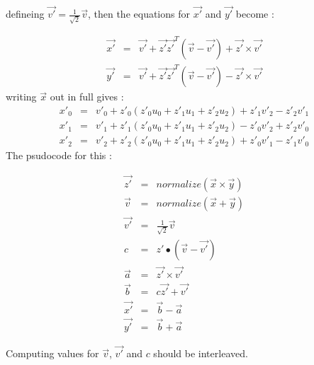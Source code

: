 \documentclass{article}
\begin{document}
defineing $\vec{v'} =  \frac{1}{\sqrt{2}} \vec{v} $, then the equations for $\vec{x'}$ and $\vec{y'}$ become :

\begin{eqnarray}
\vec{x'} &=& \vec{v'} + \vec{z'} \vec{z'}^T (\vec{v} - \vec{v'}) + \vec{z'}\times\vec{v'} \\
\vec{y'} &=& \vec{v'} + \vec{z'} \vec{z'}^T (\vec{v} - \vec{v'}) - \vec{z'}\times\vec{v'} 
\end{eqnarray}
writing $\vec{x}$ out in full gives :
\begin{eqnarray}
x'_0 &=& v'_0 + z'_0 \left( z'_0 u_0 + z'_1 u_1 + z'_2 u_2 \right )+ z'_1 v'_2 - z'_2 v'_1 \\
x'_1 &=& v'_1 + z'_1 \left( z'_0 u_0 + z'_1 u_1 + z'_2 u_2 \right )- z'_0 v'_2 + z'_2 v'_0 \\
x'_2 &=& v'_2 + z'_2 \left( z'_0 u_0 + z'_1 u_1 + z'_2 u_2 \right )+ z'_0 v'_1 - z'_1 v'_0 
\end{eqnarray}
The psudocode for this :

\begin{eqnarray}
\vec{z'} &=& normalize( \vec{x} \times \vec{y} ) \\
\vec{v}  &=& normalize( \vec{x} + \vec{y} ) \\
\vec{v'} &=& \frac{1}{\sqrt{2}} \vec{v} \\
c &=& z' \bullet ( \vec{v} - \vec{v'} ) \\
\vec{a} &=& \vec{z'} \times \vec{v'} \\
\vec{b} &=& c \vec{z'} + \vec{v'} \\
\vec{x'} &=& \vec{b} - \vec{a} \\
\vec{y'} &=& \vec{b} + \vec{a}
\end{eqnarray}

Computing values for $\vec{v}$, $\vec{v'}$ and $c$ should be interleaved.
\end{document}
